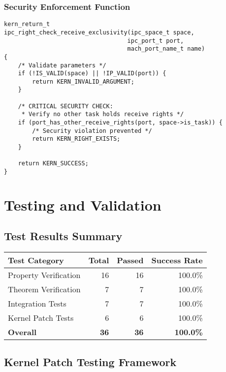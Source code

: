 \documentclass[11pt,a4paper]{article}
\begin{document}
\subsubsection{Security Enforcement Function}

\begin{lstlisting}[style=cstyle, caption=Exclusivity Enforcement Implementation]
kern_return_t
ipc_right_check_receive_exclusivity(ipc_space_t space, 
                                   ipc_port_t port, 
                                   mach_port_name_t name)
{
    /* Validate parameters */
    if (!IS_VALID(space) || !IP_VALID(port)) {
        return KERN_INVALID_ARGUMENT;
    }
    
    /* CRITICAL SECURITY CHECK:
     * Verify no other task holds receive rights */
    if (port_has_other_receive_rights(port, space->is_task)) {
        /* Security violation prevented */
        return KERN_RIGHT_EXISTS;
    }
    
    return KERN_SUCCESS;
}
\end{lstlisting}

\section{Testing and Validation}

\subsection{Test Results Summary}

\begin{center}
\begin{tabular}{|l|r|r|r|}
\hline
\textbf{Test Category} & \textbf{Total} & \textbf{Passed} & \textbf{Success Rate} \\
\hline
Property Verification & 16 & 16 & 100.0\% \\
Theorem Verification & 7 & 7 & 100.0\% \\
Integration Tests & 7 & 7 & 100.0\% \\
Kernel Patch Tests & 6 & 6 & 100.0\% \\
\hline
\textbf{Overall} & \textbf{36} & \textbf{36} & \textbf{100.0\%} \\
\hline
\end{tabular}
\end{center}

\subsection{Kernel Patch Testing Framework}
\end{document}
